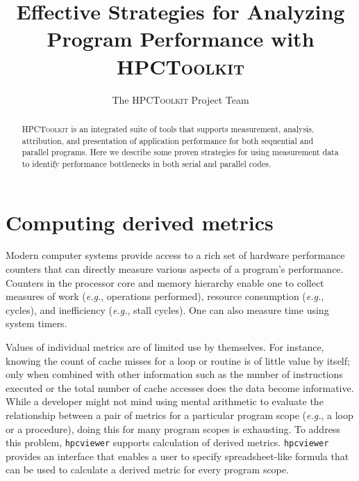 \documentclass[12pt]{article}
\newcommand{\eg}{\emph{e.g.}}  %
\newcommand{\HPCToolkit}{\textsc{HPCToolkit}}
\begin{document}




\title{Effective Strategies for Analyzing Program Performance with \HPCToolkit{}}

\author{The \HPCToolkit{} Project Team}

\maketitle



\begin{abstract}
\HPCToolkit{} is an integrated suite of tools that supports measurement, analysis, attribution, and presentation of application performance for both sequential and parallel programs. Here we describe some proven strategies for using measurement data to identify performance bottlenecks in both serial and parallel codes.
\end{abstract}


\section{Computing derived metrics}

Modern computer systems  provide access to a rich set of hardware 
performance counters that can directly measure various aspects of a program's performance. 
Counters in the processor core and memory hierarchy enable one to 
collect measures of work (\eg, operations performed), resource consumption (\eg, cycles), and inefficiency (\eg, stall cycles). 
One can also measure time using system timers.

Values of individual metrics are of limited use by themselves. 
For instance, knowing the count of cache misses for a loop or routine is of little value by itself;
only when combined with other information such as the number of instructions executed or 
the total number of cache accesses does the data become informative. While a developer might not mind using mental arithmetic to evaluate the relationship between a pair of metrics for a particular program scope (\eg, a loop or a procedure), doing this for many program scopes is exhausting. To address this problem, {\tt hpcviewer} supports calculation of derived metrics. {\tt hpcviewer} provides an interface that enables a user to specify  spreadsheet-like formula that can be used to calculate a derived metric for every program scope. 
\end{document}
